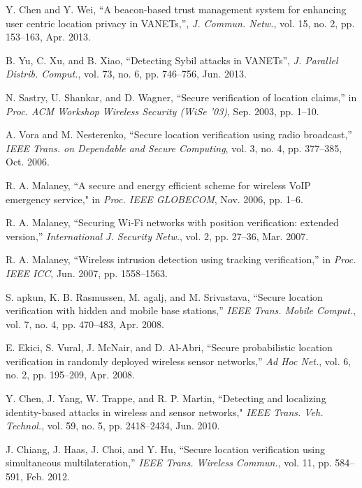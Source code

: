 \documentclass[journal]{IEEEtran}
\begin{document}
\begin{thebibliography}{1}
 Y. Chen and Y. Wei, ``A beacon-based trust management system for enhancing user centric location privacy in VANETs,'', \emph{J. Commun. Netw.}, vol. 15, no. 2, pp. 153--163, Apr. 2013.

 B. Yu, C. Xu, and B. Xiao, ``Detecting Sybil attacks in VANETs'', \emph{J. Parallel Distrib. Comput.}, vol. 73, no. 6, pp. 746--756, Jun. 2013.




 N. Sastry, U. Shankar, and D. Wagner, ``Secure verification of location claims,'' in \textit{Proc. ACM Workshop Wireless Security (WiSe '03)}, Sep. 2003, pp. 1--10.

 A. Vora and M. Nesterenko, ``Secure location verification using radio broadcast,'' \textit{IEEE Trans. on Dependable and Secure Computing}, vol. 3, no. 4, pp. 377--385, Oct. 2006.


 R. A. Malaney, ``A secure and energy efficient scheme for wireless VoIP emergency service," in \textit{Proc. IEEE GLOBECOM}, Nov. 2006, pp. 1--6.

 R. A. Malaney, ``Securing Wi-Fi networks with position verification: extended version,'' \textit{International J. Security Netw.}, vol. 2, pp. 27--36, Mar. 2007.

 R. A. Malaney, ``Wireless intrusion detection using tracking verification,'' in \textit{Proc. IEEE ICC}, Jun. 2007, pp. 1558--1563.

 S. apkun, K. B. Rasmussen, M. agalj, and M. Srivastava, ``Secure location verification with hidden and mobile base stations,'' \textit{IEEE Trans. Mobile Comput.}, vol. 7, no. 4, pp. 470--483, Apr. 2008.

 E. Ekici, S. Vural, J. McNair, and D. Al-Abri, ``Secure probabilistic location verification in randomly deployed wireless sensor networks,''  \emph{Ad Hoc Net.}, vol. 6, no. 2, pp. 195--209, Apr. 2008.

  Y. Chen, J. Yang, W. Trappe, and R. P. Martin, ``Detecting and localizing identity-based attacks in wireless and sensor networks," \textit{IEEE Trans. Veh. Technol.}, vol. 59, no. 5, pp. 2418--2434, Jun. 2010.

 J. Chiang, J. Haas, J. Choi, and Y. Hu, ``Secure location verification using simultaneous multilateration,'' \textit{IEEE Trans. Wireless Commun.}, vol. 11, pp. 584--591, Feb. 2012.


\end{thebibliography}
\end{document}
